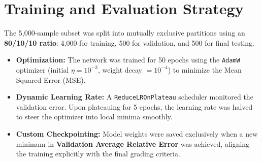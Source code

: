 \documentclass[10pt,twocolumn]{article}
\begin{document}
\begin{table}[H]
\centering
\caption{Layer Specifications and Tensor Shapes}
\end{table}

\section{Training and Evaluation Strategy}
The 5,000-sample subset was split into mutually exclusive partitions using an \textbf{80/10/10 ratio}: 4,000 for training, 500 for validation, and 500 for final testing.

\begin{itemize}[nosep, leftmargin=*]
    \item \textbf{Optimization:} The network was trained for 50 epochs using the \texttt{AdamW} optimizer (initial $\eta = 10^{-3}$, weight decay $= 10^{-4}$) to minimize the Mean Squared Error (MSE).
    \item \textbf{Dynamic Learning Rate:} A \texttt{ReduceLROnPlateau} scheduler monitored the validation error. Upon plateauing for 5 epochs, the learning rate was halved to steer the optimizer into local minima smoothly.
    \item \textbf{Custom Checkpointing:} Model weights were saved exclusively when a new minimum in \textbf{Validation Average Relative Error} was achieved, aligning the training explicitly with the final grading criteria.
\end{itemize}
\end{document}
